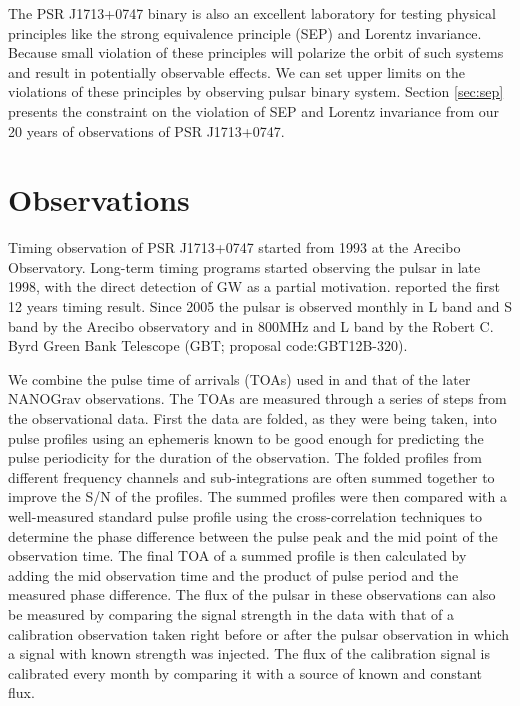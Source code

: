 The PSR J1713+0747 binary is also an excellent laboratory for testing physical 
principles like the strong equivalence principle (SEP) and Lorentz invariance. 
Because small violation of these principles will polarize the orbit of such systems and result in potentially observable effects. We can set upper limits on the violations of these principles by observing pulsar binary system. Section \ref{sec:sep} presents the constraint on the violation of SEP and Lorentz invariance from our 20 years of observations of PSR J1713+0747.

\section{Observations}
Timing observation of PSR J1713+0747 started from 1993 at the Arecibo
Observatory. Long-term timing programs started observing the pulsar in late 1998, with the direct detection of GW as a partial motivation. \citet{sns+05} reported the first 12 years timing result. Since 2005 the pulsar is observed monthly
in L band and S band by the Arecibo
observatory and in 800MHz and L band by the Robert C. Byrd Green Bank
Telescope (GBT; proposal code:GBT12B-320).

We combine the pulse time of arrivals (TOAs) used in \citealt{sns+05} and that
of the later NANOGrav observations. 
The TOAs are measured through a series of steps from the observational data. First the data are folded, as they were being taken, into pulse profiles using an ephemeris known to be good enough for predicting the pulse periodicity for the duration of the observation. The folded profiles from different frequency channels and sub-integrations are often summed together to improve the S/N of the profiles.
The summed profiles were then compared with a well-measured standard pulse profile using the cross-correlation techniques to determine the phase difference between the pulse peak and the mid point of the observation time. The final TOA of a summed profile is then calculated by adding the mid observation time and the product of pulse period and the measured phase difference.
The flux of the pulsar in these observations can also be measured by comparing the signal strength in the data with that of a calibration observation taken right before or after the pulsar observation in which a signal with known strength was injected. The flux of the calibration signal is calibrated every month by comparing it with a source of known and constant flux.


